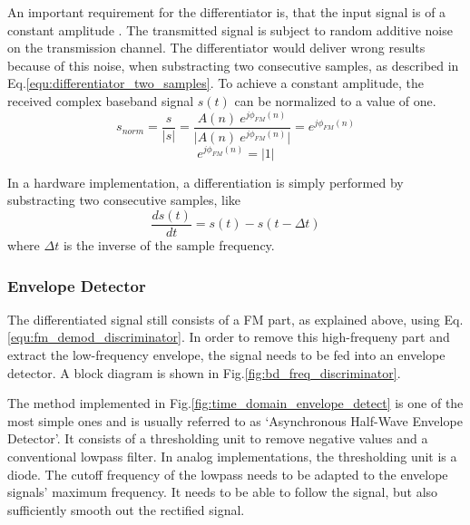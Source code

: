 An important requirement for the differentiator is, that the input signal is of a constant amplitude \cite{ref_schnyder_haller}.
The transmitted signal is subject to random additive noise on the transmission channel.
The differentiator would deliver wrong results because of this noise, when substracting two consecutive samples, as described in Eq.\eqref{equ:differentiator_two_samples}.
To achieve a constant amplitude, the received complex baseband signal $s(t)$ can be normalized to a value of one.
\begin{equation}
  s_{norm} = \frac{s}{|s|} = \frac{A(n)\ e^{j\phi_{FM}(n)}}{|{A(n)\ e^{j\phi_{FM}(n)}|}} = e^{j\phi_{FM}(n)}
\end{equation}
\begin{equation}
  e^{j\phi_{FM}(n)} = |1|
\end{equation}

In a hardware implementation, a differentiation is simply performed by substracting two consecutive samples, like
\begin{equation}
  \frac{d s(t)}{dt} = s(t) - s(t-\Delta t)
  \label{equ:differentiator_two_samples}
\end{equation}
where $\Delta t$ is the inverse of the sample frequency.\\ %

\subsubsection{Envelope Detector}

The differentiated signal still consists of a FM part, as explained above, using Eq.\eqref{equ:fm_demod_discriminator}.
In order to remove this high-frequeny part and extract the low-frequency envelope, the signal needs to be fed into an envelope detector.
A block diagram is shown in Fig.\ref{fig:bd_freq_discriminator}.

The method implemented in Fig.\ref{fig:time_domain_envelope_detect} is one of the most simple ones and is usually referred to as `Asynchronous Half-Wave Envelope Detector'\cite{ref_envelope_detector}.
It consists of a thresholding unit to remove negative values and a conventional lowpass filter.
In analog implementations, the thresholding unit is a diode.
The cutoff frequency of the lowpass needs to be adapted to the envelope signals' maximum frequency.
It needs to be able to follow the signal, but also sufficiently smooth out the rectified signal.\\

